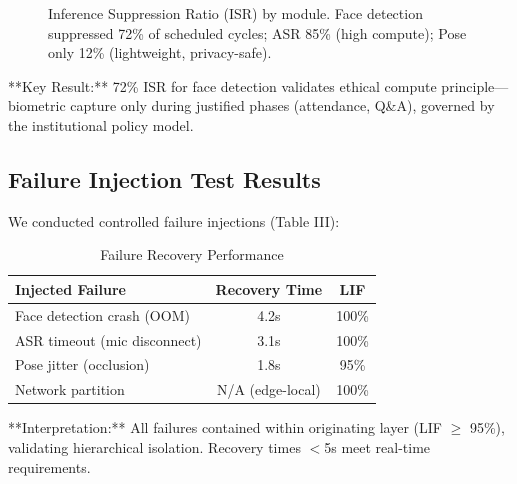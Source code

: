 \documentclass[conference]{IEEEtran}
\begin{document}
\begin{figure}[htbp]
\centering
{}

\caption{Inference Suppression Ratio (ISR) by module. Face detection suppressed 72\% of scheduled cycles; ASR 85\% (high compute); Pose only 12\% (lightweight, privacy-safe).}
\label{fig:isr}
\end{figure}

**Key Result:** 72\% ISR for face detection validates ethical compute principle---biometric capture only during justified phases (attendance, Q\&A), governed by the institutional policy model.

\subsection{Failure Injection Test Results}
We conducted controlled failure injections (Table III):

\begin{table}[htbp]
\caption{Failure Recovery Performance}
\begin{center}
\begin{tabular}{lcc}
\toprule
\textbf{Injected Failure} & \textbf{Recovery Time} & \textbf{LIF} \\
\midrule
Face detection crash (OOM) & 4.2s & 100\% \\
ASR timeout (mic disconnect) & 3.1s & 100\% \\
Pose jitter (occlusion) & 1.8s & 95\% \\
Network partition & N/A (edge-local) & 100\% \\
\bottomrule
\end{tabular}
\end{center}
\end{table}

**Interpretation:** All failures contained within originating layer (LIF $\geq$ 95\%), validating hierarchical isolation. Recovery times $<$5s meet real-time requirements.
\end{document}
